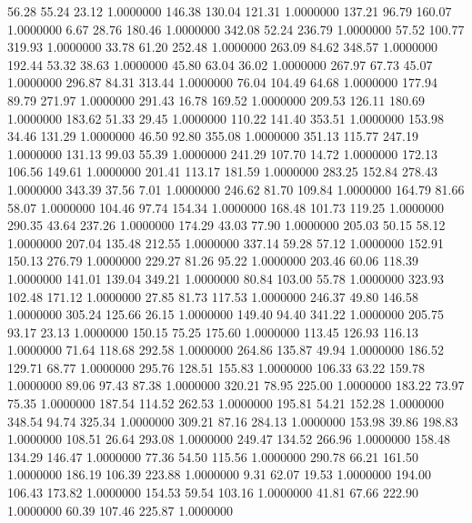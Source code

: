   56.28   55.24   23.12   1.0000000
 146.38  130.04  121.31   1.0000000
 137.21   96.79  160.07   1.0000000
   6.67   28.76  180.46   1.0000000
 342.08   52.24  236.79   1.0000000
  57.52  100.77  319.93   1.0000000
  33.78   61.20  252.48   1.0000000
 263.09   84.62  348.57   1.0000000
 192.44   53.32   38.63   1.0000000
  45.80   63.04   36.02   1.0000000
 267.97   67.73   45.07   1.0000000
 296.87   84.31  313.44   1.0000000
  76.04  104.49   64.68   1.0000000
 177.94   89.79  271.97   1.0000000
 291.43   16.78  169.52   1.0000000
 209.53  126.11  180.69   1.0000000
 183.62   51.33   29.45   1.0000000
 110.22  141.40  353.51   1.0000000
 153.98   34.46  131.29   1.0000000
  46.50   92.80  355.08   1.0000000
 351.13  115.77  247.19   1.0000000
 131.13   99.03   55.39   1.0000000
 241.29  107.70   14.72   1.0000000
 172.13  106.56  149.61   1.0000000
 201.41  113.17  181.59   1.0000000
 283.25  152.84  278.43   1.0000000
 343.39   37.56    7.01   1.0000000
 246.62   81.70  109.84   1.0000000
 164.79   81.66   58.07   1.0000000
 104.46   97.74  154.34   1.0000000
 168.48  101.73  119.25   1.0000000
 290.35   43.64  237.26   1.0000000
 174.29   43.03   77.90   1.0000000
 205.03   50.15   58.12   1.0000000
 207.04  135.48  212.55   1.0000000
 337.14   59.28   57.12   1.0000000
 152.91  150.13  276.79   1.0000000
 229.27   81.26   95.22   1.0000000
 203.46   60.06  118.39   1.0000000
 141.01  139.04  349.21   1.0000000
  80.84  103.00   55.78   1.0000000
 323.93  102.48  171.12   1.0000000
  27.85   81.73  117.53   1.0000000
 246.37   49.80  146.58   1.0000000
 305.24  125.66   26.15   1.0000000
 149.40   94.40  341.22   1.0000000
 205.75   93.17   23.13   1.0000000
 150.15   75.25  175.60   1.0000000
 113.45  126.93  116.13   1.0000000
  71.64  118.68  292.58   1.0000000
 264.86  135.87   49.94   1.0000000
 186.52  129.71   68.77   1.0000000
 295.76  128.51  155.83   1.0000000
 106.33   63.22  159.78   1.0000000
  89.06   97.43   87.38   1.0000000
 320.21   78.95  225.00   1.0000000
 183.22   73.97   75.35   1.0000000
 187.54  114.52  262.53   1.0000000
 195.81   54.21  152.28   1.0000000
 348.54   94.74  325.34   1.0000000
 309.21   87.16  284.13   1.0000000
 153.98   39.86  198.83   1.0000000
 108.51   26.64  293.08   1.0000000
 249.47  134.52  266.96   1.0000000
 158.48  134.29  146.47   1.0000000
  77.36   54.50  115.56   1.0000000
 290.78   66.21  161.50   1.0000000
 186.19  106.39  223.88   1.0000000
   9.31   62.07   19.53   1.0000000
 194.00  106.43  173.82   1.0000000
 154.53   59.54  103.16   1.0000000
  41.81   67.66  222.90   1.0000000
  60.39  107.46  225.87   1.0000000
